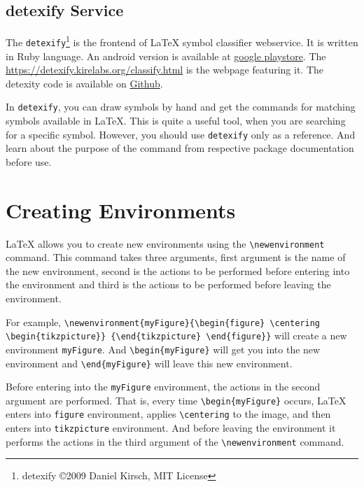 \documentclass{article}
\theoremstyle{definition}
\theoremstyle{remark}
\begin{document}
\subsection{detexify Service}
	The \texttt{detexify}\footnote{detexify \copyright 2009 Daniel Kirsch, MIT License} is the frontend of \LaTeX{} symbol classifier webservice. It is written in Ruby language. An android version is available at \href{https://play.google.com/store/apps/details?id=website.marty.detexify}{google playstore}. The \url{https://detexify.kirelabs.org/classify.html} is the webpage featuring it. The detexity code is available on \href{https://github.com/kirel/detexify}{Github}.

	In \texttt{detexify}, you can draw symbols by hand and get the commands for matching symbols available in \LaTeX{}. This is quite a useful tool, when you are searching for a specific symbol. However, you should use \texttt{detexify} only as a reference. And learn about the purpose of the command from respective package documentation before use.

\section{Creating Environments}
	\LaTeX{} allows you to create new environments using the \texttt{\textbackslash newenvironment} command. This command takes three arguments, first argument is the name of the new environment, second is the actions to be performed before entering into the environment and third is the actions to be performed before leaving the environment.

	For example, \texttt{\textbackslash newenvironment\{myFigure\}\{\textbackslash begin\{figure\} \textbackslash centering \textbackslash begin\{tikzpicture\}\} \{\textbackslash end\{tikzpicture\} \textbackslash end\{figure\}\}} will create a new environment \texttt{myFigure}. And \texttt{\textbackslash begin\{myFigure\}} will get you into the new environment and \texttt{\textbackslash end\{myFigure\}} will leave this new environment.

	Before entering into the \texttt{myFigure} environment, the actions in the second argument are performed. That is, every time \texttt{\textbackslash begin\{myFigure\}} occurs, \LaTeX{} enters into \texttt{figure} environment, applies \texttt{\textbackslash centering} to the image, and then enters into \texttt{tikzpicture} environment. And before leaving the environment it performs the actions in the third argument of the \texttt{\textbackslash newenvironment} command.
\end{document}
